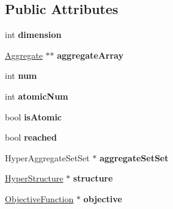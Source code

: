 \subsection*{Public Attributes}
\begin{DoxyCompactItemize}
\item 
\hypertarget{classHyperAggregate_a4d83d2c954e243ea4427563a601d60c6}{int {\bfseries dimension}}\label{classHyperAggregate_a4d83d2c954e243ea4427563a601d60c6}

\item 
\hypertarget{classHyperAggregate_a918e4c93b5f3c2da1a982ef7cc51297f}{\hyperlink{classAggregate}{Aggregate} $\ast$$\ast$ {\bfseries aggregate\-Array}}\label{classHyperAggregate_a918e4c93b5f3c2da1a982ef7cc51297f}

\item 
\hypertarget{classHyperAggregate_ac7fca59b15740a76f95bbc2a490f954f}{int {\bfseries num}}\label{classHyperAggregate_ac7fca59b15740a76f95bbc2a490f954f}

\item 
\hypertarget{classHyperAggregate_aeff461b2ab34f107505469b0fbe4a580}{int {\bfseries atomic\-Num}}\label{classHyperAggregate_aeff461b2ab34f107505469b0fbe4a580}

\item 
\hypertarget{classHyperAggregate_a49a8f6fbf66994f023141ad53d756c3e}{bool {\bfseries is\-Atomic}}\label{classHyperAggregate_a49a8f6fbf66994f023141ad53d756c3e}

\item 
\hypertarget{classHyperAggregate_a61bd0e802b8e3fa3792b03f75d035d97}{bool {\bfseries reached}}\label{classHyperAggregate_a61bd0e802b8e3fa3792b03f75d035d97}

\item 
\hypertarget{classHyperAggregate_ae024a1f7a8a9e16e18cfc08157d78067}{Hyper\-Aggregate\-Set\-Set $\ast$ {\bfseries aggregate\-Set\-Set}}\label{classHyperAggregate_ae024a1f7a8a9e16e18cfc08157d78067}

\item 
\hypertarget{classHyperAggregate_a904499d5fd048c8279babe1007a9f526}{\hyperlink{classHyperStructure}{Hyper\-Structure} $\ast$ {\bfseries structure}}\label{classHyperAggregate_a904499d5fd048c8279babe1007a9f526}

\item 
\hypertarget{classHyperAggregate_a20f30b86f34c47baf737da2f1dd3528f}{\hyperlink{classObjectiveFunction}{Objective\-Function} $\ast$ {\bfseries objective}}\label{classHyperAggregate_a20f30b86f34c47baf737da2f1dd3528f}


\end{DoxyCompactItemize}
